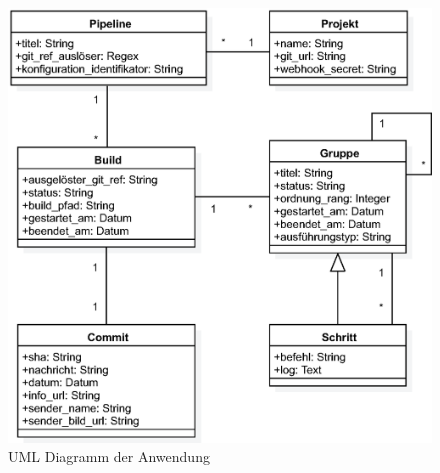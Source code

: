 \begin{figure}[h]
  \caption{UML Diagramm der Anwendung}
  \label{fig:uml}
  \centering
    \includegraphics[width=\textwidth]{assets/uml}
\end{figure}
